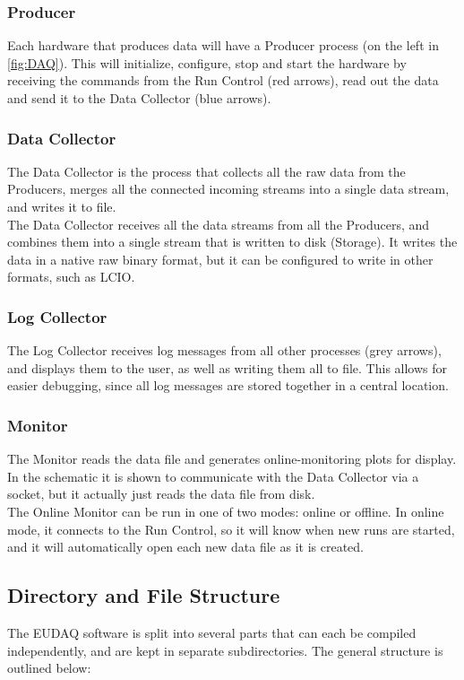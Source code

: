 \subsubsection{Producer}
Each hardware that produces data will have a Producer process (on the left in \autoref{fig:DAQ}).
This will initialize, configure, stop and start the hardware by receiving the commands from the Run Control (red arrows), read out the data and send it to the Data Collector (blue arrows).

\subsubsection{Data Collector}
The Data Collector is the process that collects all the raw data from the Producers,
merges all the connected incoming streams into a single data stream, and writes it to file.\\

The Data Collector receives all the data streams from all the Producers,
and combines them into a single stream that is written to disk (Storage).
It writes the data in a native raw binary format,
but it can be configured to write in other formats, such as \gls{LCIO}.

\subsubsection{Log Collector}
The Log Collector receives log messages from all other processes (grey arrows),
and displays them to the user, as well as writing them all to file.
This allows for easier debugging, since all log messages are stored together in a central location.

\subsubsection{Monitor}
The Monitor reads the data file and generates online-monitoring plots for display.
In the schematic it is shown to communicate with the Data Collector via a socket,
but it actually just reads the data file from disk.\\

The Online Monitor can be run in one of two modes: online or offline.
In online mode, it connects to the Run Control, so it will know when new runs are started,
and it will automatically open each new data file as it is created.



\subsection{Directory and File Structure}
The EUDAQ software is split into several parts that can each be compiled independently,
and are kept in separate subdirectories.
The general structure is outlined below:

